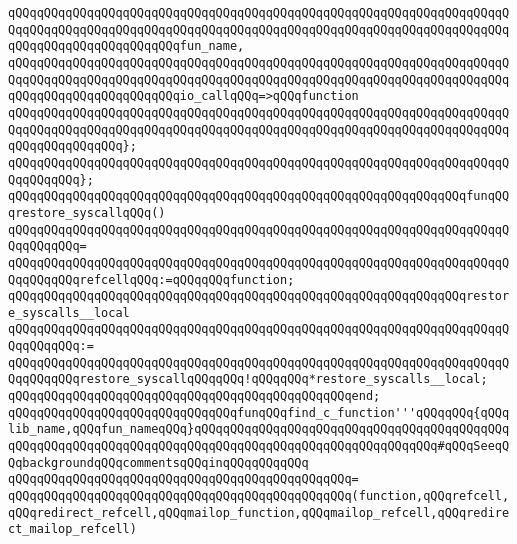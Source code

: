 \verb|qQQqqQQqqQQqqQQqqQQqqQQqqQQqqQQqqQQqqQQqqQQqqQQqqQQqqQQqqQQqqQQqqQQqqQQqqQQqqQQqqQQqqQQqqQQqqQQqqQQqqQQqqQQqqQQqqQQqqQQqqQQqqQQqqQQqqQQqqQQqqQQqqQQqqQQqqQQqqQQqqQQqfun_name,|\newline
\verb|qQQqqQQqqQQqqQQqqQQqqQQqqQQqqQQqqQQqqQQqqQQqqQQqqQQqqQQqqQQqqQQqqQQqqQQqqQQqqQQqqQQqqQQqqQQqqQQqqQQqqQQqqQQqqQQqqQQqqQQqqQQqqQQqqQQqqQQqqQQqqQQqqQQqqQQqqQQqqQQqqQQqio_callqQQq=>qQQqfunction|\newline
\verb|qQQqqQQqqQQqqQQqqQQqqQQqqQQqqQQqqQQqqQQqqQQqqQQqqQQqqQQqqQQqqQQqqQQqqQQqqQQqqQQqqQQqqQQqqQQqqQQqqQQqqQQqqQQqqQQqqQQqqQQqqQQqqQQqqQQqqQQqqQQqqQQqqQQqqQQqqQQq};|\newline
\verb|qQQqqQQqqQQqqQQqqQQqqQQqqQQqqQQqqQQqqQQqqQQqqQQqqQQqqQQqqQQqqQQqqQQqqQQqqQQqqQQq};|\newline
\newline
\verb|qQQqqQQqqQQqqQQqqQQqqQQqqQQqqQQqqQQqqQQqqQQqqQQqqQQqqQQqqQQqqQQqfunqQQqrestore_syscallqQQq()|\newline
\verb|qQQqqQQqqQQqqQQqqQQqqQQqqQQqqQQqqQQqqQQqqQQqqQQqqQQqqQQqqQQqqQQqqQQqqQQqqQQqqQQq=|\newline
\verb|qQQqqQQqqQQqqQQqqQQqqQQqqQQqqQQqqQQqqQQqqQQqqQQqqQQqqQQqqQQqqQQqqQQqqQQqqQQqqQQqrefcellqQQq:=qQQqqQQqfunction;|\newline
\newline
\verb|qQQqqQQqqQQqqQQqqQQqqQQqqQQqqQQqqQQqqQQqqQQqqQQqqQQqqQQqqQQqqQQqrestore_syscalls__local|\newline
\verb|qQQqqQQqqQQqqQQqqQQqqQQqqQQqqQQqqQQqqQQqqQQqqQQqqQQqqQQqqQQqqQQqqQQqqQQqqQQqqQQq:=|\newline
\verb|qQQqqQQqqQQqqQQqqQQqqQQqqQQqqQQqqQQqqQQqqQQqqQQqqQQqqQQqqQQqqQQqqQQqqQQqqQQqqQQqrestore_syscallqQQqqQQq!qQQqqQQq*restore_syscalls__local;|\newline
\verb|qQQqqQQqqQQqqQQqqQQqqQQqqQQqqQQqqQQqqQQqqQQqqQQqend;|\newline
\newline
\verb|qQQqqQQqqQQqqQQqqQQqqQQqqQQqqQQqfunqQQqfind_c_function'''qQQqqQQq{qQQqlib_name,qQQqfun_nameqQQq}qQQqqQQqqQQqqQQqqQQqqQQqqQQqqQQqqQQqqQQqqQQqqQQqqQQqqQQqqQQqqQQqqQQqqQQqqQQqqQQqqQQqqQQqqQQqqQQqqQQqqQQq#qQQqSeeqQQqbackgroundqQQqcommentsqQQqinqQQqqQQqqQQq|\newline
\verb|qQQqqQQqqQQqqQQqqQQqqQQqqQQqqQQqqQQqqQQqqQQqqQQq=|\newline
\verb|qQQqqQQqqQQqqQQqqQQqqQQqqQQqqQQqqQQqqQQqqQQqqQQq(function,qQQqrefcell,qQQqredirect_refcell,qQQqmailop_function,qQQqmailop_refcell,qQQqredirect_mailop_refcell)|\newline
